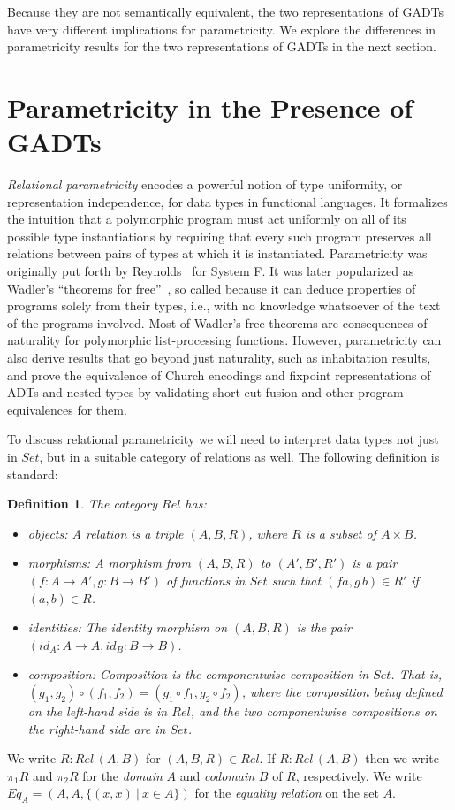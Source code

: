 \documentclass[submission,copyright,creativecommons]{eptcs}
\newtheorem{definition}[thm]{Definition}
\begin{document}
Because they are not semantically equivalent, the two representations
of GADTs have very different implications for parametricity. We
explore the differences in parametricity results for the two
representations of GADTs in the next section.

\section{Parametricity in the Presence of GADTs}\label{sec:par}
{\em Relational parametricity} encodes a powerful notion of type
uniformity, or representation independence, for data types in
functional languages. It formalizes the intuition that a polymorphic
program must act uniformly on all of its possible type instantiations
by requiring that every such program preserves all relations between
pairs of types at which it is instantiated. Parametricity was
originally put forth by Reynolds~\cite{rey83} for System F. It was
later popularized as Wadler's ``theorems for free''~\cite{wad89}, so
called because it can deduce properties of programs solely from their
types, i.e., with no knowledge whatsoever of the text of the programs
involved.  Most of Wadler's free theorems are consequences of
naturality for polymorphic list-processing functions. However,
parametricity can also derive results that go beyond just naturality,
such as inhabitation results, and prove the equivalence of Church
encodings and fixpoint representations of ADTs and
nested types by validating short cut fusion and other program
equivalences for them.

To discuss relational parametricity we will need to interpret data
types not just in $\mathit{Set}$, but in a suitable category of
relations as well. The following definition is standard:
\begin{definition}\label{def:rel}
  The category $\mathit{Rel}$ has:
  \begin{itemize}
\item objects: A relation is a triple $(A,B,R)$, where $R$ is a
  subset of $A \times B$.
\item morphisms: A morphism from $(A,B,R)$ to $(A',B',R')$ is a pair
  $(f : A \to A',g : B \to B')$ of functions in $\mathit{Set}$ such
  that $(f a,g\,b) \in R'$ if $(a,b) \in R$.
\item identities: The identity morphism on $(A,B,R)$ is the pair
  $(\mathit{id}_A : A \to A, \mathit{id}_B : B \to B)$.
\item composition: Composition is the componentwise composition in
  $\mathit{Set}$. That is, $(g_1,g_2) \circ (f_1,f_2) = (g_1 \circ
  f_1, g_2 \circ f_2)$, where the composition being defined on the
  left-hand side is in $\mathit{Rel}$, and the two componentwise
  compositions on the right-hand side are in $\mathit{Set}$.
\end{itemize}
\end{definition}
\noindent
We write $R : \mathit{Rel}\,(A,B)$ for $(A,B,R) \in \mathit{Rel}$.  If
$R : \mathit{Rel}\,(A,B)$ then we write $\pi_1 R$ and $\pi_2 R$ for
the {\em domain} $A$ and {\em codomain} $B$ of $R$, respectively. We
write $\mathit{Eq}_A = (A,A,\{(x,x)~|~ x \in A\})$ for the {\em
  equality relation} on the set $A$.
\end{document}

